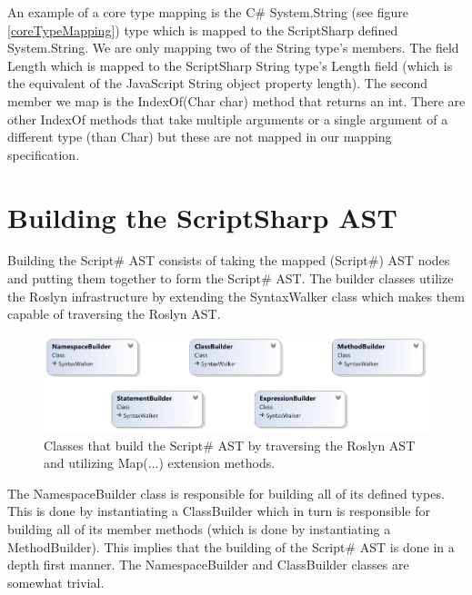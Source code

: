 			An example of a core type mapping is the C\# System.String (see figure \ref{coreTypeMapping}) type which is mapped to the ScriptSharp defined System.String. We are only mapping two of the String type’s members. The field Length which is mapped to the ScriptSharp String type’s Length field (which is the equivalent of the JavaScript String object property length). The second member we map is the IndexOf(Char char) method that returns an int. There are other IndexOf methods that take multiple arguments or a single argument of a different type (than Char) but these are not mapped in our mapping specification.

\section{Building the ScriptSharp AST} %
\label{sec:building_the_scriptsharp_ast}
	Building the Script\# AST consists of taking the mapped (Script\#) AST nodes and putting them together to form the Script\# AST. The builder classes utilize the Roslyn infrastructure by extending the SyntaxWalker class which makes them capable of traversing the Roslyn AST.
	\begin{figure}[H]
		\begin{center}
			\centerline{\includegraphics[width=16cm]{resources/images/BuilderClasses.png}}
		\end{center}
		\caption{Classes that build the Script\# AST by traversing the Roslyn AST and utilizing Map(...) extension methods.}
		\label{builderClasses}
	\end{figure}

	The NamespaceBuilder class is responsible for building all of its defined types. This is done by instantiating a ClassBuilder which in turn is responsible for building all of its member methods (which is done by instantiating a MethodBuilder). This implies that the building of the Script\# AST is done in a depth first manner. The NamespaceBuilder and ClassBuilder classes are somewhat trivial. 

